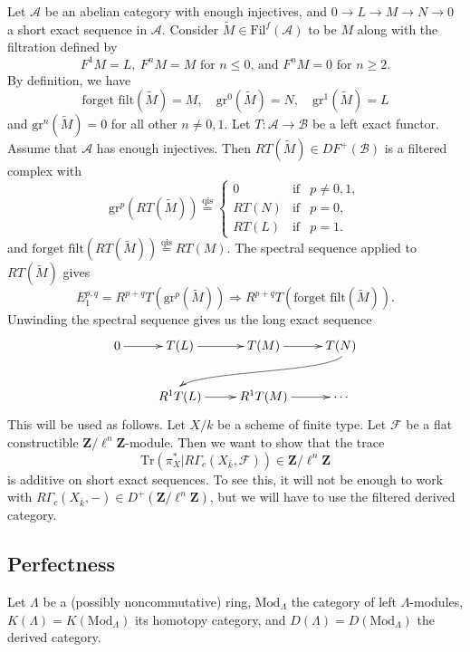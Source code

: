 Let $\mathcal{A}$ be an abelian category with enough injectives, and $0 \to L \to M \to N \to 0$ a short exact sequence in $\mathcal{A}$. Consider $\widetilde M \in \text{Fil}^f(\mathcal{A})$ to be $M$ along with the filtration defined by 
$$
F^1M = L, \ F^nM = M
\text{ for $n \leq 0$, and $F^nM = 0$ for $n \geq 2$.} 
$$
By definition, we have
$$
\text{forget filt}(\widetilde M) = M, \quad
\text{gr}^0(\widetilde M) = N, \quad
\text{gr}^1(\widetilde M) = L 
$$
and $\text{gr}^n(\widetilde M) = 0$ for all other $n \neq 0,1$. Let $T: \mathcal{A} \to \mathcal{B}$ be a left exact functor. Assume that $\mathcal{A}$ has enough injectives.  Then $RT(\widetilde M) \in D F^+(\mathcal{B})$ is a filtered complex with 
$$
\text{gr}^p(RT(\widetilde M)) \stackrel {\mathrm{qis}}{=} \left \{
\begin{matrix}
0 & \text{if} & p \neq 0,1, \\
RT(N) & \text{if} & p = 0, \\
RT(L) & \text{if} & p = 1.
\end{matrix}
\right . 
$$
and $\text{forget filt}(RT(\widetilde M))\stackrel{\text{qis}}{ = } RT(M)$. The spectral sequence applied to $RT(\widetilde M)$ gives
$$
E_1^{p,q} = R^{p+q}T(\mathrm{gr}^p(\widetilde M)) \Rightarrow R^{p+q}T(\text{forget filt}(\widetilde M)).
$$
Unwinding the spectral sequence gives us the long exact sequence
$$
\xymatrix{
  0 \ar[r] & T(L) \ar[r] & T(M) \ar[r] & T(N) \ar@(rd,ul)[rdllllr] \\
& R^1T(L) \ar[r] & R^1T(M) \ar[r] & \cdots
}
$$
This will be used as follows. Let $X/k$ be a scheme of finite type.  Let $\mathcal{F}$ be a flat constructible $\mathbf{Z}/\ell^n \mathbf{Z}$-module.  Then we want to show that the trace 
$$
\text{Tr}( \pi_X^\ast | R\Gamma_c(X_{\bar k}, \mathcal{F})) \in \mathbf{Z}/\ell^n \mathbf{Z}
$$
is additive on short exact sequences. To see this, it will not be enough to work with $R\Gamma_c(X_{\bar k}, -) \in D^+(\mathbf{Z}/\ell^n \mathbf{Z})$, but we will have to use the filtered derived category.

\subsection{Perfectness}

Let $\Lambda$ be a (possibly noncommutative) ring, $\text{Mod}_{\Lambda}$ the category of left $\Lambda$-modules, $K(\Lambda) = K(\text{Mod}_\Lambda)$ its homotopy category, and $D(\Lambda)= D(\text{Mod}_\Lambda)$ the derived category. 

